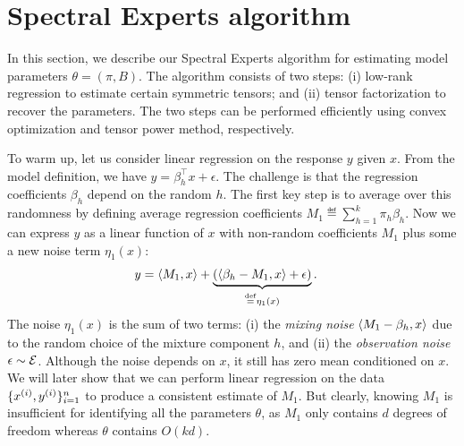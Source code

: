 \section{Spectral Experts algorithm}
\label{sec:algo}

In this section, we describe our Spectral Experts algorithm
for estimating model parameters $\theta = (\pi, B)$.
The algorithm consists of two steps:
(i) low-rank regression to estimate certain symmetric tensors;
and (ii) tensor factorization to recover the parameters.
The two steps can be performed efficiently using
convex optimization and tensor power method, respectively.

To warm up, let us consider linear regression
on the response $y$ given $x$.
From the model definition, we have $y = \beta_h^\top x + \epsilon$.
The challenge is that the regression coefficients $\beta_h$ depend on the random $h$.
The first key step is to average over this randomness by defining
average regression coefficients
$M_1 \eqdef \sum_{h=1}^k \pi_h \beta_h$.
Now we can express $y$ as a linear function of $x$ with non-random coefficients $M_1$
plus some a new noise term $\eta_1(x)$:
\begin{align}
  y &= \langle M_1, x \rangle +
  \underbrace{(\langle \beta_h - M_1, x \rangle + \epsilon)}_{\stackrel{\rm def}{=} \eta_1(x)}. \label{eqn:y1}
\end{align}
The noise $\eta_1(x)$ is the sum of two terms:
(i) the \emph{mixing noise} $\langle M_1 - \beta_h, x \rangle$
due to the random choice of the mixture component $h$,
and (ii) the \emph{observation noise} $\epsilon \sim \mathcal{E}$.
Although the noise depends on $x$,
it still has zero mean conditioned on $x$.
We will later show that we can
perform linear regression on the data $\{x^{(i)},
y^{(i)}\}_{i=1}^{n}$ to produce a consistent estimate of $M_1$.
But clearly, knowing $M_1$ is insufficient
for identifying all the parameters $\theta$,
as
$M_1$ only contains $d$ degrees of freedom whereas $\theta$ contains $O(kd)$.

